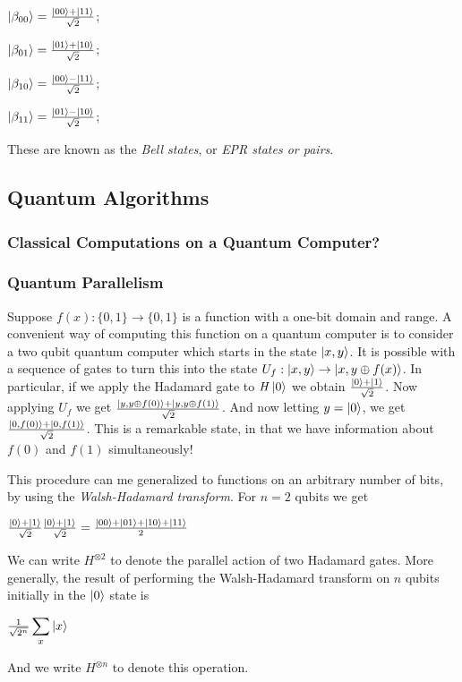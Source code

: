 \documentclass{article}
\begin{document}
\begin{center}
  $\ket{\beta_{00}} = \frac{\ket{00} + \ket{11}}{\sqrt 2}$;

  $\ket{\beta_{01}} = \frac{\ket{01} + \ket{10}}{\sqrt 2}$;

  $\ket{\beta_{10}} = \frac{\ket{00} - \ket{11}}{\sqrt 2}$;

  $\ket{\beta_{11}} = \frac{\ket{01} - \ket{10}}{\sqrt 2}$;
\end{center}
These are known as the \emph{Bell states}, or \emph{EPR states or pairs}.

\subsection{Quantum Algorithms}

\subsubsection{Classical Computations on a Quantum Computer?}

\subsubsection{Quantum Parallelism}
Suppose $f(x) : \{0, 1\} \to \{0, 1\}$ is a function with a one-bit domain
and range. A convenient way of computing this function on a quantum computer is
to consider a two qubit quantum computer which starts in the state $\ket{x, y}$.
It is possible with a sequence of gates to turn this into the state
$U_f : \ket{x, y} \to \ket{x, y \oplus f(x)}$.  In particular, if we apply
the Hadamard gate to
$\mathit{H} \ket{0}$ we obtain $\frac{\ket{0} + \ket{1}}{\sqrt 2}$. Now
applying
$U_f$ we get $\frac{\ket{y, y \oplus f(0)} + \ket{y, y \oplus f(1)}}{\sqrt 2}$.
And now letting $y = \ket{0}$, we get
$\frac{\ket{0, f(0)} + \ket{0, f(1)}}{\sqrt 2}$.  This is a remarkable state,
in that we have information about $f(0)$ and $f(1)$ simultaneously!

This procedure can me generalized to functions on an arbitrary number of bits,
by using the \emph{Walsh-Hadamard transform}. For $n = 2$ qubits we get

\begin{center}
  $\frac{\ket{0} + \ket{1}}{\sqrt 2}\frac{\ket{0} + \ket{1}}{\sqrt 2} = 
   \frac{\ket{00} + \ket{01} + \ket{10} + \ket{11}}{2}$
\end{center}
We can write $\mathit{H}^{\otimes 2}$ to denote the parallel action of two
Hadamard gates. More generally, the result of performing the Walsh-Hadamard
transform on $n$ qubits initially in the $\ket{0}$ state is

\begin{center}
  $\frac{1}{\sqrt{2^{n}}}\displaystyle\sum_{x} \ket{x}$
\end{center}
And we write $\mathit{H}^{\otimes n}$ to denote this operation.

\end{document}
